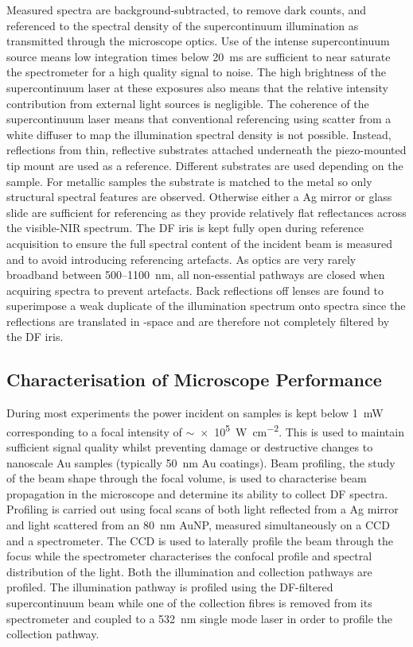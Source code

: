 \documentclass{article}
\begin{document}
Measured spectra are background-subtracted, to remove dark counts, and referenced to the spectral density of the supercontinuum illumination as transmitted through the microscope optics. Use of the intense supercontinuum source means low integration times below \SI{20}{ms} are sufficient to near saturate the spectrometer for a high quality signal to noise. The high brightness of the supercontinuum laser at these exposures also means that the relative intensity contribution from external light sources is negligible.
The coherence of the supercontinuum laser means that conventional referencing using scatter from a white diffuser to map the illumination spectral density is not possible. Instead, reflections from thin, reflective substrates attached underneath the piezo-mounted tip mount are used as a reference. Different substrates are used depending on the sample. For metallic samples the substrate is matched to the metal so only structural spectral features are observed. Otherwise either a Ag mirror or glass slide are sufficient for referencing as they provide relatively flat reflectances across the visible-NIR spectrum. The DF iris is kept fully open during reference acquisition to ensure the full spectral content of the incident beam is measured and to avoid introducing referencing artefacts. As optics are very rarely broadband between 500--\SI{1100}{nm}, all non-essential pathways are closed when acquiring spectra to prevent artefacts. Back reflections off lenses are found to superimpose a weak duplicate of the illumination spectrum onto spectra since the reflections are translated in \wvm-space and are therefore not completely filtered by the DF iris.

\subsection{Characterisation of Microscope Performance}

During most experiments the power incident on samples is kept below \SI{1}{mW} corresponding to a focal intensity of $\sim$\SI{e5}{\watt\per\centi\metre\squared}. This is used to maintain sufficient signal quality whilst preventing damage or destructive changes to nanoscale Au samples (typically \SI{50}{nm} Au coatings). Beam profiling, the study of the beam shape through the focal volume, is used to characterise beam propagation in the microscope and determine its ability to collect DF spectra. Profiling is carried out using focal scans of both light reflected from a Ag mirror and light scattered from an \SI{80}{nm} AuNP, measured simultaneously on a CCD and a spectrometer. The CCD is used to laterally profile the beam through the focus while the spectrometer characterises the confocal profile and spectral distribution of the light. Both the illumination and collection pathways are profiled. The illumination pathway is profiled using the DF-filtered supercontinuum beam while one of the collection fibres is removed from its spectrometer and coupled to a \SI{532}{nm} single mode laser in order to profile the collection pathway.
\end{document}
